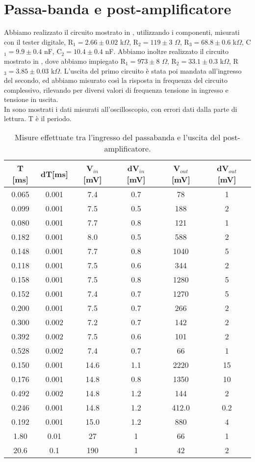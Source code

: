 \section{Passa-banda e post-amplificatore}
Abbiamo realizzato il circuito mostrato in , utilizzando i componenti, misurati con il tester digitale, R$_1 = 2.66 \pm 0.02$ k$\Omega$, R$_2 = 119 \pm 3$ $\Omega$, R$_3 = 68.8 \pm 0.6$ k$\Omega$, C$_1 = 9.9 \pm 0.4$ nF, C$_2 = 10.4 \pm 0.4$ nF. Abbiamo inoltre realizzato il circuito mostrato in , dove abbiamo impiegato R$_1 = 973 \pm 8$ $\Omega$, R$_2 = 33.1 \pm 0.3$ k$\Omega$, R$_3 = 3.85 \pm 0.03$ k$\Omega$. L'uscita del primo circuito è stata poi mandata all'ingresso del secondo, ed abbiamo misurato così la risposta in frequenza del circuito complessivo, rilevando per diversi valori di frequenza tensione in ingresso e tensione in uscita.\\
In  sono mostrati i dati misurati all'oscilloscopio, con errori dati dalla parte di lettura. T è il periodo.
\begin{table}[h]
	\centering
	\begin{tabular}{cccccc}		
		{T [ms]} & {dT[ms]} & {V$_{in}$ [mV]} & {dV$_{in}$ [mV]} & {V$_{out}$ [mV]} & {dV$_{out}$ [mV]} \\
		 \midrule
	0.065 & 0.001& 7.4 & 0.7 &78 & 1 \\ 	
	0.099 & 0.001& 7.5 & 0.5 &188 & 2 \\ 
	0.080 & 0.001& 7.7 & 0.8 &121 & 1 \\ 
	0.182 & 0.001& 8.0 & 0.5 &588 & 2 \\ 
	0.148 & 0.001& 7.7 & 0.8 &1040 & 5 \\ 
	0.118 & 0.001 &7.5 & 0.6 &344 & 2 \\ 
	0.158 & 0.001 &7.5 & 0.8& 1280 & 5 \\ 
	0.152 & 0.001 &7.4 & 0.7 &1270 & 5 \\ 
	0.200 & 0.001 &7.5 & 0.7 &266 & 2 \\ 
	0.300 & 0.002 &7.2 & 0.7 &142 & 2 \\ 
	0.392 & 0.002 &7.5 & 0.6 &101 & 2 \\ 
	0.528 & 0.002 &7.4 & 0.7 &66 & 1 \\ 
	0.150 & 0.001 &14.6 & 1.1 &2220 & 15 \\ 
	0.176 & 0.001 &14.8 & 0.8 &1350 & 10 \\ 
	0.492 & 0.002 &14.8 & 1.2 &144 & 2 \\ 
	0.246 & 0.001 &14.8 & 1.2 &412.0 & 0.2 \\ 
	0.192 & 0.001 &15.0 & 1.2 &880 & 4 \\ 
	1.80 & 0.01 &27 & 1& 66 & 1 \\ 
	20.6 & 0.1 &190 & 1& 42 & 2 \\ 
 	\end{tabular}
	\caption{Misure effettuate tra l'ingresso del passabanda e l'uscita del post-amplificatore. }
	\label{t:passabanda}
\end{table}
